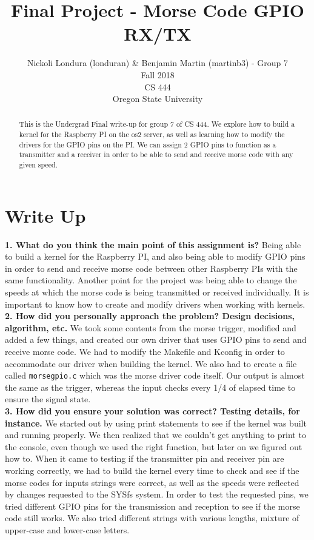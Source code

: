 \documentclass[10pt,english]{article}
\title{Final Project - Morse Code GPIO RX/TX}
\author{Nickoli Londura (londuran) \& Benjamin Martin (martinb3) - Group 7 \\ Fall 2018 \\ CS 444 \\ Oregon State University}
\begin{document}
\maketitle

\begin{abstract}

\noindent This is the Undergrad Final write-up for group 7 of CS 444. We explore how to build a kernel for the Raspberry PI on the os2 server, as well as learning how to modify the drivers for the GPIO pins on the PI. We can assign 2 GPIO pins to function as a transmitter and a receiver in order to be able to send and receive morse code with any given speed.

\end{abstract}

\newpage

\section{Write Up}

\textbf{1. What do you think the main point of this assignment is?}
Being able to build a kernel for the Raspberry PI, and also being able to modify GPIO pins in order to send and receive morse code between other Raspberry PIs with the same functionality. Another point for the project was being able to change the speeds at which the morse code is being transmitted or received individually. It is important to know how to create and modify drivers when working with kernels. \\

\noindent \textbf{2. How did you personally approach the problem? Design decisions, algorithm, etc.}
We took some contents from the morse trigger, modified and added a few things, and created our own driver that uses GPIO pins to send and receive morse code. We had to modify the Makefile and Kconfig in order to accommodate our driver when building the kernel. We also had to create a file called \verb|morsegpio.c| which was the morse driver code itself. Our output is almost the same as the trigger, whereas the input checks every 1/4 of elapsed time to ensure the signal state. \\


\noindent \textbf{3. How did you ensure your solution was correct? Testing details, for instance.}
We started out by using print statements to see if the kernel was built and running properly. We then realized that we couldn't get anything to print to the console, even though we used the right function, but later on we figured out how to. When it came to testing if the transmitter pin and receiver pin are working correctly, we had to build the kernel every time to check and see if the morse codes for inputs strings were correct, as well as the speeds were reflected by changes requested to the SYSfs system. In order to test the requested pins, we tried different GPIO pins for the transmission and reception to see if the morse code still works. We also tried different strings with various lengths, mixture of upper-case and lower-case letters. \\
\end{document}

